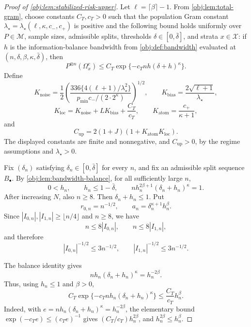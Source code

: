 \documentclass[11pt]{article}
\begin{document}
\begin{proof}[Proof of \cref{obj:lem:stabilized-risk-upper}]
Let \(\ell=\lceil\beta\rceil-1\).  From \cref{obj:lem:total-gram}, choose constants \(C_T,c_T>0\) such that the population Gram constant
\(\lambda_\star=\lambda_\star(\ell,\kappa,c_-,c_+)\) is positive and the following bound holds uniformly over \(P\in\mathcal M\), sample sizes, admissible splits, thresholds \(\delta\in[0,\bar\delta]\), and strata \(x\in\mathcal X\): if \(h\) is the information-balance bandwidth from \cref{obj:def:bandwidth} evaluated at \((n,\delta,\beta,\kappa,\bar\delta)\), then
\[
P^{\otimes n}(\Omega_x^c)
\le
C_T\exp\{-c_T n h(\delta+h)^\kappa\}.
\]
Define
\[
K_{\mathrm{noise}}
=
\frac12
\left(
\frac{336\{4(\ell+1)/\lambda_\star^2\}}
{p_{\min}c_-/(2\cdot2^\kappa)}
\right)^{1/2},
\qquad
K_{\mathrm{bias}}=\frac{2\sqrt{\ell+1}}{\lambda_\star},
\]
\[
K_{\mathrm{loc}}
=
K_{\mathrm{noise}}+LK_{\mathrm{bias}}+\frac{C_T}{c_T},
\qquad
K_{\mathrm{atom}}=\frac{c_+}{\kappa+1},
\]
and
\[
C_{\mathrm{up}}
=
2(1+J)(1+K_{\mathrm{atom}}K_{\mathrm{loc}}).
\]
The displayed constants are finite and nonnegative, and \(C_{\mathrm{up}}>0\), by the regime assumptions and \(\lambda_\star>0\). %

Fix \((\delta_n)\) satisfying \(\delta_n\in[0,\bar\delta]\) for every \(n\), and fix an admissible split sequence \(B_\bullet\).  By \cref{obj:lem:bandwidth-balance}, for all sufficiently large \(n\),
\[
0<h_n,
\qquad
h_n\le 1-\bar\delta,
\qquad
n h_n^{2\beta+1}(\delta_n+h_n)^\kappa=1 .
\]
After increasing \(N\), also \(n\ge8\).  Then \(\delta_n+h_n\le1\).  Put
\[
r_{0,n}=n^{-1/2},
\qquad
a_n=\delta_n^{\kappa+1}h_n^\beta .
\]
Since \(|I_{0,n}|,|I_{1,n}|\ge\lfloor n/4\rfloor\) and \(n\ge8\), we have
\[
n\le8|I_{0,n}|,
\qquad
n\le8|I_{1,n}|,
\]
and therefore
\[
|I_{0,n}|^{-1/2}\le3n^{-1/2},
\qquad
|I_{1,n}|^{-1/2}\le3n^{-1/2}.
\]

The balance identity gives
\[
n h_n(\delta_n+h_n)^\kappa=h_n^{-2\beta}.
\]
Thus, using \(h_n\le1\) and \(\beta>0\),
\[
C_T\exp\{-c_T n h_n(\delta_n+h_n)^\kappa\}
\le
\frac{C_T}{c_T}h_n^\beta .
\]
Indeed, with \(e=n h_n(\delta_n+h_n)^\kappa=h_n^{-2\beta}\), the elementary bound
\(\exp(-c_Te)\le(c_Te)^{-1}\) gives \((C_T/c_T)h_n^{2\beta}\), and
\(h_n^{2\beta}\le h_n^\beta\). %


\end{proof}
\end{document}

